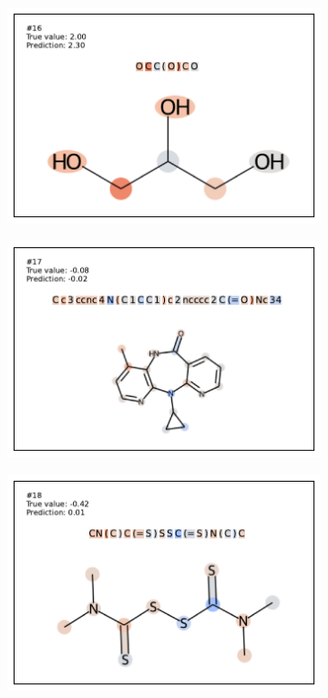 \begin{figure}
\begin{subfigure}[b]{0.33\textwidth}
\end{subfigure}
\begin{subfigure}[b]{0.33\textwidth} 
  \centering 
  \includegraphics[width=\textwidth]{figures/esol/esol16.pdf} 
\end{subfigure}\begin{subfigure}[b]{0.33\textwidth} 
  \centering 
  \includegraphics[width=\textwidth]{figures/esol/esol17.pdf} 
\end{subfigure}\begin{subfigure}[b]{0.33\textwidth} 
  \centering 
  \includegraphics[width=\textwidth]{figures/esol/esol18.pdf} 

\end{subfigure}
\end{figure}
